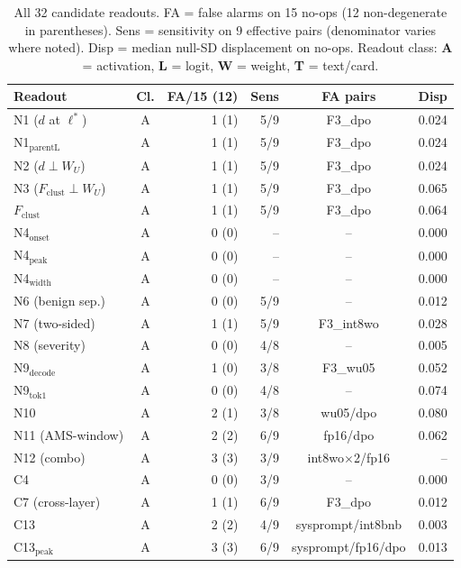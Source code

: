 \documentclass[11pt,letterpaper]{article}
\begin{document}
\begin{table}[!htbp]
\centering
\scriptsize
\caption{All 32 candidate readouts. FA = false alarms on 15 no-ops (12 non-degenerate in parentheses). Sens = sensitivity on 9 effective pairs (denominator varies where noted). Disp = median null-SD displacement on no-ops. Readout class: \textbf{A} = activation, \textbf{L} = logit, \textbf{W} = weight, \textbf{T} = text/card.}
\label{tab:specificity}
\begin{tabular}{lcrrcr}
\toprule
\textbf{Readout} & \textbf{Cl.} & \textbf{FA/15 (12)} & \textbf{Sens} & \textbf{FA pairs} & \textbf{Disp} \\
\midrule
N1 ($d$ at $\ell^*$) & A & 1 (1) & 5/9 & F3\_dpo & 0.024 \\
N1$_\text{parentL}$ & A & 1 (1) & 5/9 & F3\_dpo & 0.024 \\
N2 ($d \perp W_U$)  & A & 1 (1) & 5/9 & F3\_dpo & 0.024 \\
N3 ($F_\text{clust} \perp W_U$) & A & 1 (1) & 5/9 & F3\_dpo & 0.065 \\
$F_\text{clust}$ & A & 1 (1) & 5/9 & F3\_dpo & 0.064 \\
N4$_\text{onset}$ & A & 0 (0) & -- & -- & 0.000 \\
N4$_\text{peak}$  & A & 0 (0) & -- & -- & 0.000 \\
N4$_\text{width}$ & A & 0 (0) & -- & -- & 0.000 \\
N6 (benign sep.) & A & 0 (0) & 5/9 & -- & 0.012 \\
N7 (two-sided)   & A & 1 (1) & 5/9 & F3\_int8wo & 0.028 \\
N8 (severity)    & A & 0 (0) & 4/8 & -- & 0.005 \\
N9$_\text{decode}$ & A & 1 (0) & 3/8 & F3\_wu05 & 0.052 \\
N9$_\text{tok1}$ & A & 0 (0) & 4/8 & -- & 0.074 \\
N10              & A & 2 (1) & 3/8 & wu05/dpo & 0.080 \\
N11 (AMS-window) & A & 2 (2) & 6/9 & fp16/dpo & 0.062 \\
N12 (combo)      & A & 3 (3) & 3/9 & int8wo$\times$2/fp16 & -- \\
C4               & A & 0 (0) & 3/9 & -- & 0.000 \\
C7 (cross-layer) & A & 1 (1) & 6/9 & F3\_dpo & 0.012 \\
C13              & A & 2 (2) & 4/9 & sysprompt/int8bnb & 0.003 \\
C13$_\text{peak}$ & A & 3 (3) & 6/9 & sysprompt/fp16/dpo & 0.013 \\

\end{tabular}
\end{table}
\end{document}
